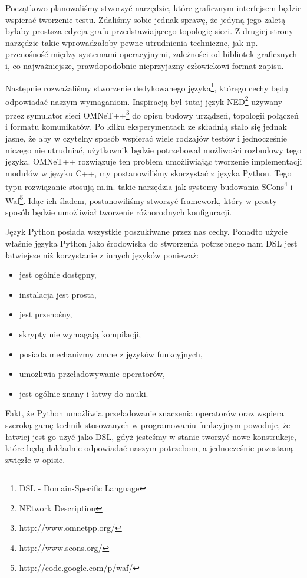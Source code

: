 \documentclass[00-praca-magisterska.tex]{subfiles}
\begin{document}
Początkowo planowaliśmy stworzyć narzędzie, które graficznym interfejsem
będzie wspierać tworzenie testu. Zdaliśmy sobie jednak sprawę, że jedyną jego
zaletą byłaby prostsza edycja grafu przedstawiającego topologię sieci. Z
drugiej strony narzędzie takie wprowadzałoby pewne utrudnienia techniczne, jak
np. przenośność między systemami operacyjnymi, zależności od bibliotek
graficznych i, co najważniejsze, prawdopodobnie nieprzyjazny człowiekowi
format zapisu.

Następnie rozważaliśmy stworzenie dedykowanego języka\footnote{DSL -
Domain-Specific Language}, którego cechy będą odpowiadać naszym wymaganiom.
Inspiracją był tutaj język NED\footnote{NEtwork Description} używany przez
symulator sieci OMNeT++\footnote{http://www.omnetpp.org/} do opisu budowy
urządzeń, topologii połączeń i formatu komunikatów. Po kilku eksperymentach ze
składnią stało się jednak jasne, że aby w czytelny sposób wspierać wiele
rodzajów testów i jednocześnie niczego nie utrudniać, użytkownik będzie
potrzebował możliwości rozbudowy tego języka. OMNeT++ rozwiązuje ten problem
umożliwiając tworzenie implementacji modułów w języku C++, my postanowiliśmy
skorzystać z języka Python. Tego typu rozwiązanie stosują m.in. takie narzędzia
jak systemy budowania SCons\footnote{http://www.scons.org/} i
Waf\footnote{http://code.google.com/p/waf/}.  Idąc ich śladem, postanowiliśmy
stworzyć framework, który w prosty sposób będzie umożliwiał tworzenie
różnorodnych konfiguracji.

Język Python posiada wszystkie poszukiwane przez nas cechy. Ponadto użycie właśnie
języka Python jako środowiska do stworzenia potrzebnego nam DSL jest łatwiejsze niż
korzystanie z innych języków ponieważ:
\begin{itemize}
\item jest ogólnie dostępny,
\item instalacja jest prosta,
\item jest przenośny,
\item skrypty nie wymagają kompilacji,
\item posiada mechanizmy znane z języków funkcyjnych,
\item umożliwia przeładowywanie operatorów,
\item jest ogólnie znany i łatwy do nauki.
\end{itemize}

Fakt, że Python umożliwia przeładowanie znaczenia operatorów oraz wspiera
szeroką gamę technik stosowanych w programowaniu funkcyjnym powoduje, że
łatwiej jest go użyć jako DSL, gdyż jesteśmy w stanie tworzyć nowe konstrukcje,
które będą dokładnie odpowiadać naszym potrzebom, a jednocześnie pozostaną
zwięzłe w opisie.
\end{document}
